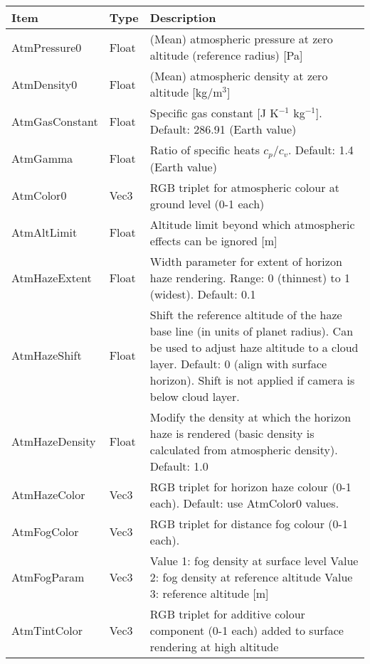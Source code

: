 \documentclass[Orbiter Developer Manual.tex]{subfiles}
\begin{document}
	\begin{longtable}{ |p{}|p{}|p{}| }
	\hline\rule{0pt}{2ex}
	\textbf{Item} & \textbf{Type} & \textbf{Description}\\
	\hline\rule{0pt}{2ex}
	AtmPressure0 & Float & (Mean) atmospheric pressure at zero altitude (reference radius) [Pa]\\
	\hline\rule{0pt}{2ex}
	AtmDensity0 & Float & (Mean) atmospheric density at zero altitude [kg/m$^{3}$]\\
	\hline\rule{0pt}{2ex}
	AtmGasConstant & Float & Specific gas constant [J K$^{-1}$ kg$^{-1}$]. Default: 286.91 (Earth value)\\
	\hline\rule{0pt}{2ex}
	AtmGamma & Float & Ratio of specific heats $c_{p}$/$c_{v}$. Default: 1.4 (Earth value)\\
	\hline\rule{0pt}{2ex}
	AtmColor0 & Vec3 & RGB triplet for atmospheric colour at ground level (0-1 each)\\
	\hline\rule{0pt}{2ex}
	AtmAltLimit & Float & Altitude limit beyond which atmospheric effects can be ignored [m]\\
	\hline\rule{0pt}{2ex}
	AtmHazeExtent & Float & Width parameter for extent of horizon haze rendering. Range: 0 (thinnest) to 1 (widest). Default: 0.1\\
	\hline\rule{0pt}{2ex}
	AtmHazeShift & Float & Shift the reference altitude of the haze base line (in units of planet radius). Can be used to adjust haze altitude to a cloud layer. Default: 0 (align with surface horizon). Shift is not applied if camera is below cloud layer.\\
	\hline\rule{0pt}{2ex}
	AtmHazeDensity & Float & Modify the density at which the horizon haze is rendered (basic density is calculated from atmospheric density). Default: 1.0\\
	\hline\rule{0pt}{2ex}
	AtmHazeColor & Vec3 & RGB triplet for horizon haze colour (0-1 each). Default: use AtmColor0 values.\\
	\hline\rule{0pt}{2ex}
	AtmFogColor & Vec3 & RGB triplet for distance fog colour (0-1 each).\\
	\hline\rule{0pt}{2ex}
	AtmFogParam & Vec3 & Value 1: fog density at surface level\newline
	Value 2: fog density at reference altitude\newline
	Value 3: reference altitude [m]\\
	\hline\rule{0pt}{2ex}
	AtmTintColor & Vec3 & RGB triplet for additive colour component (0-1 each) added to surface rendering at high altitude\\

\end{longtable}
\end{document}
